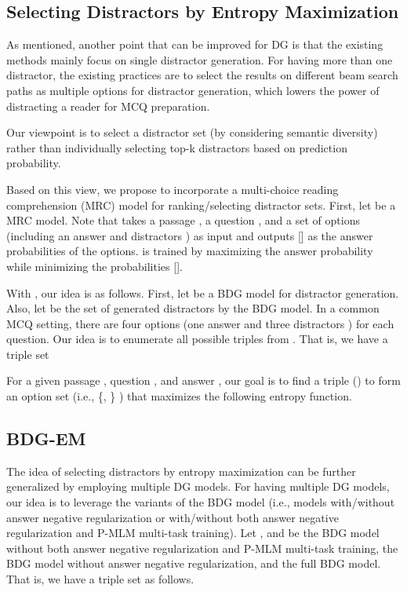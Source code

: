 \documentclass[11pt,a4paper]{article}
\begin{document}
\subsection{Selecting Distractors by Entropy Maximization}\label{sec:EM}
As mentioned, another point that can be improved for DG is that the existing methods mainly focus on single distractor generation. For having more than one distractor, the existing practices are to select the results on different beam search paths as multiple options for distractor generation, which lowers the power of distracting a reader for MCQ preparation. 

Our viewpoint is to select a distractor set (by considering semantic diversity) rather than individually selecting top-k distractors based on prediction probability. 

Based on this view, we propose to incorporate a multi-choice reading comprehension (MRC) model for ranking/selecting distractor sets. First, let  be a MRC model. Note that  takes a passage , a question , and a set of options (including an answer  and distractors ) as input and outputs [] as the answer probabilities of the options.  is trained by maximizing the answer probability  while minimizing the probabilities []. 

With , our idea is as follows. First, let  be a BDG model for distractor generation. Also, let  be the set of generated distractors by the BDG model. In a common MCQ setting, there are four options (one answer  and three distractors ) for each question. Our idea is to enumerate all possible triples from . That is, we have a triple set 


For a given passage , question , and answer , our goal is to find a triple () to form an option set  (i.e., \{, \} ) that maximizes the following entropy function.





\subsection{BDG-EM}\label{sec:model-ensemble}
The idea of selecting distractors by entropy maximization can be further generalized by employing multiple DG models. For having multiple DG models, our idea is to leverage the variants of the BDG model (i.e., models with/without answer negative regularization or with/without both answer negative regularization and P-MLM multi-task training). Let , and  be the BDG model without both answer negative regularization and P-MLM multi-task training, the BDG model without answer negative regularization, and the full BDG model. That is, we have a triple set as follows.
\end{document}
